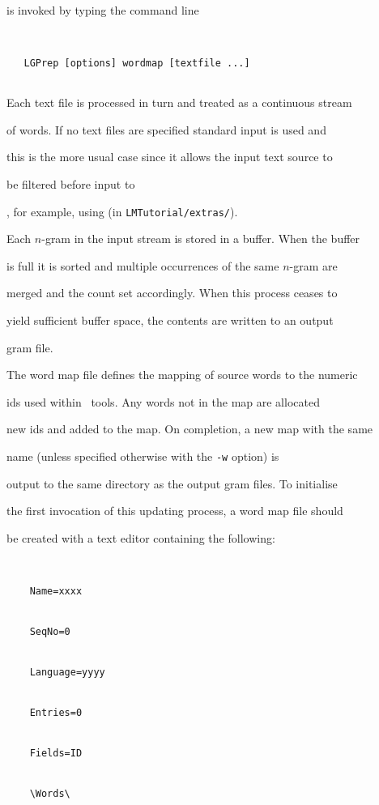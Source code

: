 




 is invoked by typing the command line


\begin{verbatim}


   LGPrep [options] wordmap [textfile ...]


\end{verbatim}


Each text file is processed in turn and treated as a continuous stream


of words.  If no text files are specified standard input is used and


this is the more usual case since it allows the input text source to


be filtered before input to


, for example, using  (in {\tt LMTutorial/extras/}).





Each $n$-gram in the input stream is stored in a buffer.  When the buffer


is full it is sorted and multiple occurrences of the same $n$-gram are


merged and the count set accordingly.  When this process ceases to


yield sufficient buffer space, the contents are written to an output


gram file.





The word map file defines the mapping of source words to the numeric


ids used within \HLM\ tools.  Any words not in the map are allocated


new ids and added to the map.  On completion, a new map with the same


name (unless specified otherwise with the \texttt{-w} option) is


output to the same directory as the output gram files.  To initialise


the first invocation of this updating process, a word map file should


be created with a text editor containing the following:


\begin{verbatim}


    Name=xxxx


    SeqNo=0


    Language=yyyy


    Entries=0


    Fields=ID


    \Words\


\end{verbatim}


